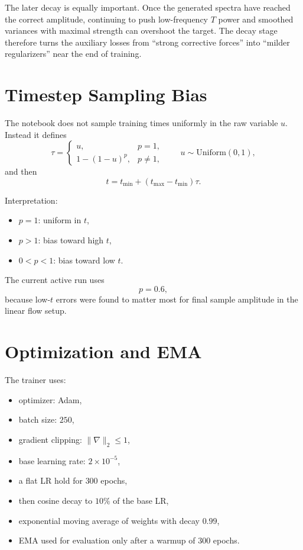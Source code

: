 \documentclass[11pt]{article}
\begin{document}
The later decay is equally important. Once the generated spectra have reached the correct amplitude, continuing to push low-frequency \(T\) power and smoothed variances with maximal strength can overshoot the target. The decay stage therefore turns the auxiliary losses from ``strong corrective forces'' into ``milder regularizers'' near the end of training.

\section{Timestep Sampling Bias}

The notebook does not sample training times uniformly in the raw variable \(u\). Instead it defines
\begin{equation}
  \tau =
  \begin{cases}
    u, & p = 1,\\
    1-(1-u)^p, & p \neq 1,
  \end{cases}
  \qquad
  u\sim \mathrm{Uniform}(0,1),
\end{equation}
and then
\begin{equation}
  t = t_{\min} + (t_{\max}-t_{\min})\tau.
\end{equation}

Interpretation:
\begin{itemize}[leftmargin=1.5em]
  \item \(p=1\): uniform in \(t\),
  \item \(p>1\): bias toward high \(t\),
  \item \(0<p<1\): bias toward low \(t\).
\end{itemize}

The current active run uses
\begin{equation}
  p = 0.6,
\end{equation}
because low-\(t\) errors were found to matter most for final sample amplitude in the linear flow setup.

\section{Optimization and EMA}

The trainer uses:
\begin{itemize}[leftmargin=1.5em]
  \item optimizer: Adam,
  \item batch size: \(250\),
  \item gradient clipping: \(\|\nabla\|_2 \le 1\),
  \item base learning rate: \(2\times 10^{-5}\),
  \item a flat LR hold for \(300\) epochs,
  \item then cosine decay to \(10\%\) of the base LR,
  \item exponential moving average of weights with decay \(0.99\),
  \item EMA used for evaluation only after a warmup of \(300\) epochs.
\end{itemize}
\end{document}
